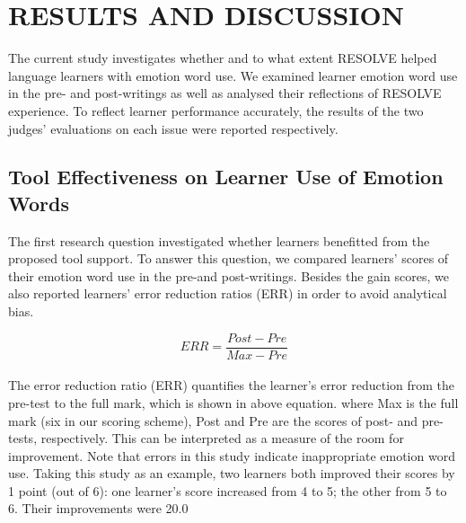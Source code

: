 \documentclass[a4paper,12pt,oneside]{article}
\begin{document}
\newpage
\section{RESULTS AND DISCUSSION}
The current study investigates whether and to what extent RESOLVE helped language learners with emotion word use. We examined learner emotion word use in the pre- and post-writings as well as analysed their reflections of RESOLVE experience. To reflect learner performance accurately, the results of the two judges’ evaluations on each issue were reported respectively. 
\subsection{Tool Effectiveness on Learner Use of Emotion Words}
The first research question investigated whether learners benefitted from the proposed tool support. To answer this question, we compared learners’ scores of their emotion word use in the pre-and post-writings. Besides the gain scores, we also reported learners’ error reduction ratios (ERR) in order to avoid analytical bias. 

\begin{equation}
    ERR = \dfrac{Post-Pre}{Max-Pre}
\end{equation}

\paragraph{}
The error reduction ratio (ERR) quantifies the learner’s error reduction from the pre-test to the full mark, which is shown in above equation. where Max is the full mark (six in our scoring scheme), Post and Pre are the scores of post- and pre-tests, respectively. This can be interpreted as a measure of the room for improvement. Note that errors in this study indicate inappropriate emotion word use. Taking this study as an example, two learners both improved their scores by 1 point (out of 6): one learner’s score increased from 4 to 5; the other from 5 to 6. Their improvements were 20.0%
\end{document}
